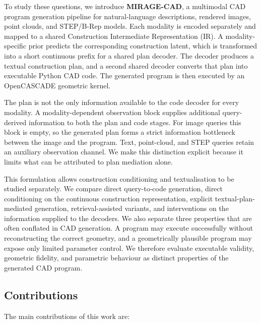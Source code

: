 \documentclass[preprint,12pt]{elsarticle}
\begin{document}
To study these questions, we introduce \textbf{MIRAGE-CAD}, a multimodal CAD
program generation pipeline for natural-language descriptions, rendered
images, point clouds, and STEP/B-Rep models. Each modality is encoded
separately and mapped to a shared Construction Intermediate Representation
(IR). A modality-specific prior predicts the corresponding construction
latent, which is transformed into a short continuous prefix for a shared plan
decoder. The decoder produces a textual construction plan, and a second shared
decoder converts that plan into executable Python CAD code. The generated
program is then executed by an OpenCASCADE geometric kernel.

The plan is not the only information available to the code decoder for every
modality. A modality-dependent observation block supplies additional
query-derived information to both the plan and code stages. For image queries
this block is empty, so the generated plan forms a strict information
bottleneck between the image and the program. Text, point-cloud, and STEP
queries retain an auxiliary observation channel. We make this distinction
explicit because it limits what can be attributed to plan mediation alone.

This formulation allows construction conditioning and textualisation to be
studied separately. We compare direct query-to-code generation, direct
conditioning on the continuous construction representation, explicit
textual-plan-mediated generation, retrieval-assisted variants, and
interventions on the information supplied to the decoders. We also separate three properties
that are often conflated in CAD generation. A program may execute successfully
without reconstructing the correct geometry, and a geometrically plausible
program may expose only limited parameter control. We therefore evaluate
executable validity, geometric fidelity, and parametric behaviour as distinct
properties of the generated CAD program.

\subsection{Contributions}
\label{sec:contributions}

The main contributions of this work are:
\end{document}
